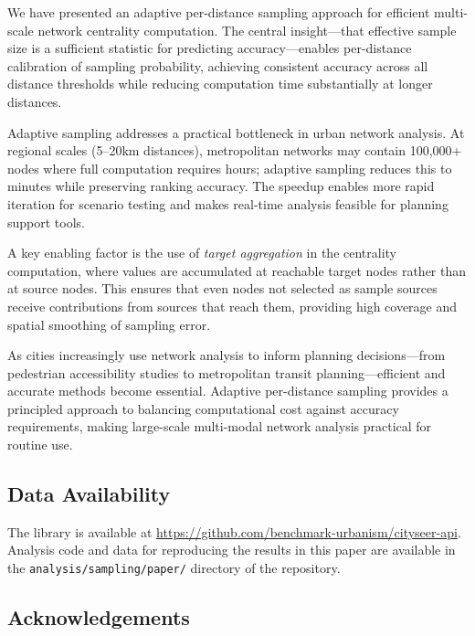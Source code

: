 
We have presented an adaptive per-distance sampling approach for efficient multi-scale network centrality computation. The central insight---that effective sample size is a sufficient statistic for predicting accuracy---enables per-distance calibration of sampling probability, achieving consistent accuracy across all distance thresholds while reducing computation time substantially at longer distances.

Adaptive sampling addresses a practical bottleneck in urban network analysis. At regional scales (5--20km distances), metropolitan networks may contain 100,000+ nodes where full computation requires hours; adaptive sampling reduces this to minutes while preserving ranking accuracy. The speedup enables more rapid iteration for scenario testing and makes real-time analysis feasible for planning support tools.

A key enabling factor is the use of \emph{target aggregation} in the centrality computation, where values are accumulated at reachable target nodes rather than at source nodes. This ensures that even nodes not selected as sample sources receive contributions from sources that reach them, providing high coverage and spatial smoothing of sampling error.

As cities increasingly use network analysis to inform planning decisions---from pedestrian accessibility studies to metropolitan transit planning---efficient and accurate methods become essential. Adaptive per-distance sampling provides a principled approach to balancing computational cost against accuracy requirements, making large-scale multi-modal network analysis practical for routine use.

\subsection*{Data Availability}

The \cityseer{} library is available at \url{https://github.com/benchmark-urbanism/cityseer-api}. Analysis code and data for reproducing the results in this paper are available in the \texttt{analysis/sampling/paper/} directory of the repository.

\subsection*{Acknowledgements}

